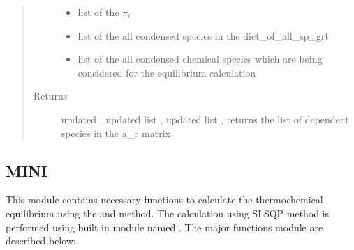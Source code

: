 \documentclass[letterpaper,10pt,english]{sphinxmanual}
\begin{document}
\begin{fulllineitems}
\begin{quote}
\begin{description}
\begin{itemize}
\item {} 
 \textendash{} list of the \(\pi _i\)

\item {} 
 \textendash{} list of the all condensed species in the dict\_of\_all\_sp\_grt

\item {} 
 \textendash{} list of the all condensed chemical species which are being considered for the equilibrium calculation

\end{itemize}

\item[{Returns}] \leavevmode
updated , updated list , updated list , returns the list of dependent species in the a\_c matrix

\end{description}\end{quote}

\end{fulllineitems}



\subsection{MINI}
\label{\detokenize{code_structure:mini}}

This module contains necessary functions to calculate the thermochemical equilibrium using the  and  method. The calculation using SLSQP method is performed using built in  module named . The major functions  module are described below:
\end{document}
